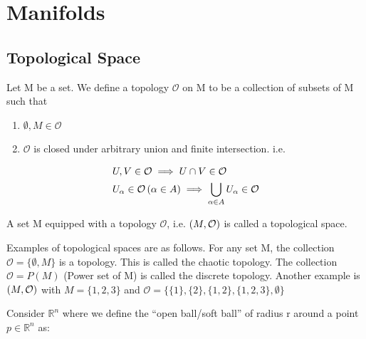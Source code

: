 
\chapter{Manifolds}
\label{ch:chapter2}

\section{Topological Space}

\begin{definition}
    Let M be a set. We define a topology $ \mathcal{O}$ on M to be a collection of subsets of M such that
    \begin{enumerate}[label=(\roman*)]
        \item $ \emptyset, M \in \mathcal{O}$
        \item $ \mathcal{O}$ is closed under arbitrary union and finite intersection. i.e.
    \end{enumerate}

    \begin{align*}
        & U, V \in \mathcal{O} \implies U \cap V \in \mathcal{O} \\
        & U_\alpha \in \mathcal{O} \left(  \alpha \in A \right) \implies \bigcup_{\alpha \in A} U_\alpha \in \mathcal{O} \\
    \end{align*}
\end{definition}

\begin{definition}
    A set M equipped with a topology $ \mathcal{O}$, i.e. $ \left(  M, \mathcal{O} \right)$ is called a topological space.
\end{definition}

Examples of topological spaces are as follows. For any set M, the collection $ \mathcal{O} = \{ \emptyset, M \}$ is a topology. This is called the chaotic topology. The collection $ \mathcal{O} = P(M)$ (Power set of M) is called the discrete topology. Another example is $ \left( M, \mathcal{O} \right)$ with $M = \{ 1,2,3 \} $ and $ \mathcal{O} = \{ \{1\}, \{2\}, \{1,2\}, \{1,2,3\}, \emptyset \} $



Consider $ \mathbb{R}^n$ where we define the ``open ball/soft ball'' of radius r around a point $ p \in \mathbb{R}^n$ as:


